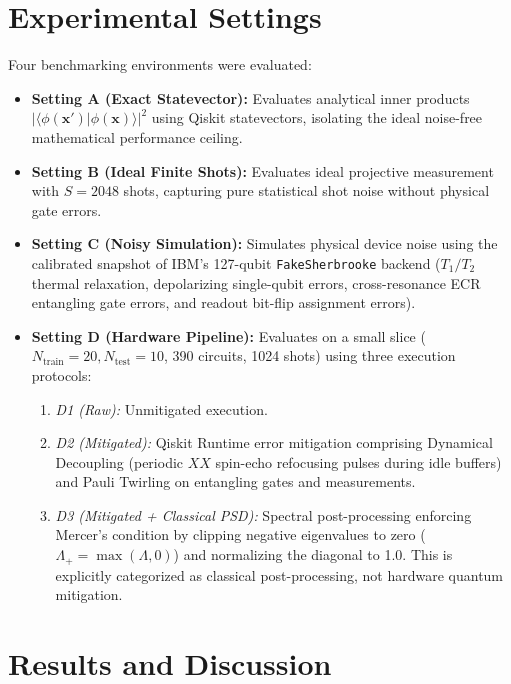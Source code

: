 \documentclass[12pt,a4paper]{article}
\begin{document}
\section{Experimental Settings}

Four benchmarking environments were evaluated:
\begin{itemize}
    \item \textbf{Setting A (Exact Statevector):} Evaluates analytical inner products $|\langle \phi(\mathbf{x}') | \phi(\mathbf{x}) \rangle|^2$ using Qiskit statevectors, isolating the ideal noise-free mathematical performance ceiling.
    \item \textbf{Setting B (Ideal Finite Shots):} Evaluates ideal projective measurement with $S=2048$ shots, capturing pure statistical shot noise without physical gate errors.
    \item \textbf{Setting C (Noisy Simulation):} Simulates physical device noise using the calibrated snapshot of IBM's 127-qubit \texttt{FakeSherbrooke} backend ($T_1/T_2$ thermal relaxation, depolarizing single-qubit errors, cross-resonance ECR entangling gate errors, and readout bit-flip assignment errors).
    \item \textbf{Setting D (Hardware Pipeline):} Evaluates on a small slice ($N_{\text{train}}=20, N_{\text{test}}=10$, 390 circuits, 1024 shots) using three execution protocols:
    \begin{enumerate}
        \item \emph{D1 (Raw):} Unmitigated execution.
        \item \emph{D2 (Mitigated):} Qiskit Runtime error mitigation comprising Dynamical Decoupling (periodic $XX$ spin-echo refocusing pulses during idle buffers) and Pauli Twirling on entangling gates and measurements.
        \item \emph{D3 (Mitigated + Classical PSD):} Spectral post-processing enforcing Mercer's condition by clipping negative eigenvalues to zero ($\Lambda_+ = \max(\Lambda, 0)$) and normalizing the diagonal to 1.0. This is explicitly categorized as classical post-processing, not hardware quantum mitigation.
    \end{enumerate}
\end{itemize}

\section{Results and Discussion}
\end{document}
